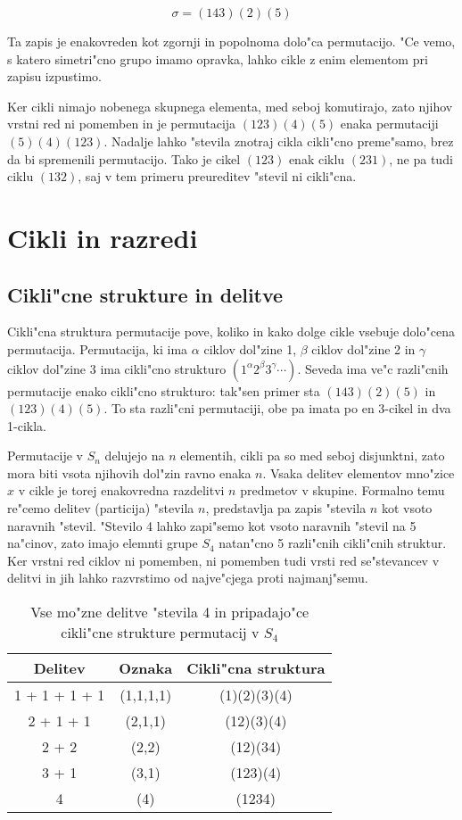 \documentclass[a4paper,10pt]{article}
\begin{document}
$$\sigma = (143)(2)(5)$$

Ta zapis je enakovreden kot zgornji in popolnoma dolo"ca permutacijo. "Ce vemo, s katero simetri"cno grupo imamo opravka, lahko cikle z enim elementom pri zapisu izpustimo. 

Ker cikli nimajo nobenega skupnega elementa, med seboj komutirajo, zato njihov vrstni red ni pomemben in je permutacija $(123)(4)(5)$ enaka permutaciji $(5)(4)(123)$. Nadalje lahko "stevila znotraj cikla cikli"cno preme"samo, brez da bi spremenili permutacijo. Tako je cikel $(123)$ enak ciklu $(231)$, ne pa tudi ciklu $(132)$, saj v tem primeru preureditev "stevil ni cikli"cna. 

\section{Cikli in razredi}

\subsection{Cikli"cne strukture in delitve}

Cikli"cna struktura permutacije pove, koliko in kako dolge cikle vsebuje dolo"cena permutacija. Permutacija, ki ima $\alpha$ ciklov dol"zine 1, $\beta$ ciklov dol"zine 2 in $\gamma$ ciklov dol"zine 3 ima cikli"cno strukturo $(1^\alpha 2^\beta 3^\gamma \cdots )$. Seveda ima ve"c razli"cnih permutacije enako cikli"cno strukturo: tak"sen primer sta $(143)(2)(5)$ in $(123)(4)(5)$. To sta razli"cni permutaciji, obe pa imata po en 3-cikel in dva 1-cikla. 

Permutacije v $S_n$ delujejo na $n$ elementih, cikli pa so med seboj disjunktni, zato mora biti vsota njihovih dol"zin ravno enaka $n$. Vsaka delitev elementov mno"zice $x$ v cikle je torej enakovredna razdelitvi $n$ predmetov v skupine. Formalno temu re"cemo delitev (particija) "stevila $n$, predstavlja pa zapis "stevila $n$ kot vsoto naravnih "stevil. "Stevilo 4 lahko zapi"semo kot vsoto naravnih "stevil na 5 na"cinov, zato imajo elemnti grupe $S_4$ natan"cno 5 razli"cnih cikli"cnih struktur. Ker vrstni red ciklov ni pomemben, ni pomemben tudi vrsti red se"stevancev v delitvi in jih lahko razvrstimo od najve"cjega proti najmanj"semu. 

\begin{table}[h]
\centering
 \begin{tabular}{|c|c|c|}
 \hline
  Delitev & Oznaka & Cikli"cna struktura \\
  \hline
  1 + 1 + 1 + 1 & (1,1,1,1) & (1)(2)(3)(4) \\
  2 + 1 + 1 & (2,1,1) & (12)(3)(4) \\
  2 + 2 & (2,2) & (12)(34) \\
  3 + 1 & (3,1) & (123)(4) \\
  4 & (4) & (1234) \\
  \hline
 \end{tabular}
 \label{tab:delitve}
 \caption{Vse mo"zne delitve "stevila 4 in pripadajo"ce cikli"cne strukture permutacij v $S_4$}
 \end{table}
 
\end{document}
